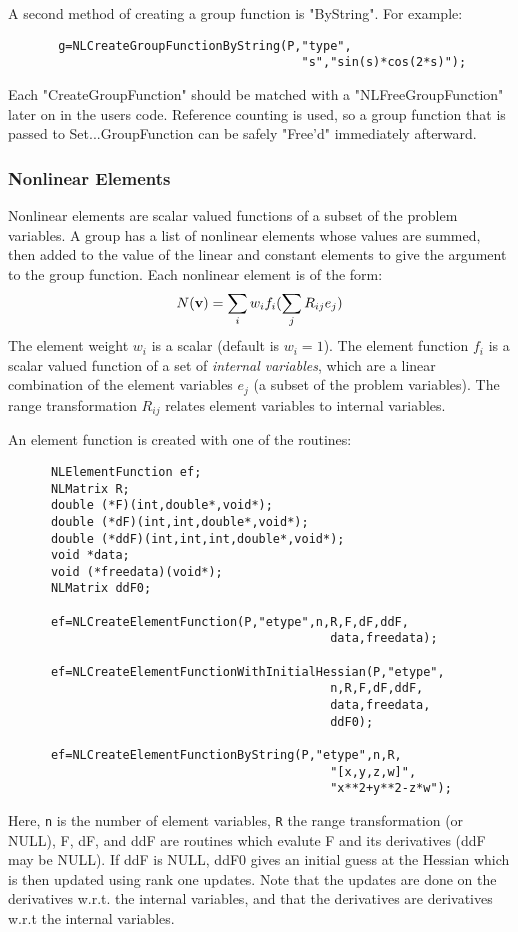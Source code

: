 \documentclass[12pt]{article}
\begin{document}
      A second method of creating a group function is "ByString". For example:
     \begin{verbatim}
       g=NLCreateGroupFunctionByString(P,"type",
                                         "s","sin(s)*cos(2*s)");
     \end{verbatim}

      Each "CreateGroupFunction" should be matched with a "NLFreeGroupFunction" later on in the users code. Reference
      counting is used, so a group function that is passed to Set...GroupFunction can be safely "Free'd" immediately 
      afterward.

   \subsubsection{Nonlinear Elements}

      Nonlinear elements are scalar valued functions of a subset of the problem variables. A group has a list of nonlinear
      elements whose values are summed, then added to the value of the linear and constant elements to give the argument
      to the group function. Each nonlinear element is of the form:
     \begin{displaymath}
          N({\bf v}) = \sum_i w_i f_i( \sum_j R_{ij} e_j )
     \end{displaymath}
     The element weight $w_i$ is a scalar (default is $w_i=1$). The element function $f_i$ is a scalar valued function
     of a set of {\it internal variables}, which are a linear combination of the element variables $e_j$ (a subset of
     the problem variables). The range transformation $R_{ij}$ relates element variables to internal variables.

     An element function is created with one of the routines:
     \begin{verbatim}
      NLElementFunction ef;
      NLMatrix R;
      double (*F)(int,double*,void*);
      double (*dF)(int,int,double*,void*);
      double (*ddF)(int,int,int,double*,void*);
      void *data;
      void (*freedata)(void*);
      NLMatrix ddF0;

      ef=NLCreateElementFunction(P,"etype",n,R,F,dF,ddF,
                                             data,freedata);

      ef=NLCreateElementFunctionWithInitialHessian(P,"etype",
                                             n,R,F,dF,ddF,
                                             data,freedata,
                                             ddF0);

      ef=NLCreateElementFunctionByString(P,"etype",n,R,
                                             "[x,y,z,w]",
                                             "x**2+y**2-z*w");
     \end{verbatim}
     Here, {\tt n} is the number of element variables, {\tt R} the range transformation (or NULL), F, dF, and ddF
     are routines which evalute F and its derivatives (ddF may be NULL). If ddF is NULL, ddF0 gives an initial
     guess at the Hessian which is then updated using rank one updates. Note that the updates are done on the
     derivatives w.r.t. the internal variables, and that the derivatives are derivatives w.r.t the internal variables.
\end{document}
